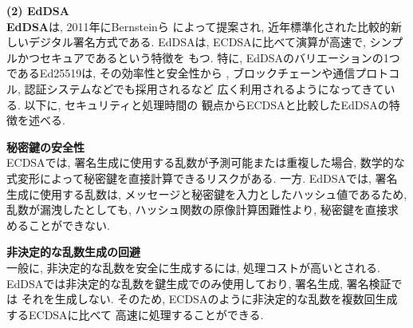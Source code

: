 \documentclass[a4j,9pt,twocolumn]{jsarticle}
\begin{document}
\noindent\textbf{(2) EdDSA}\\
\indent \textbf{EdDSA}は,  2011年にBernsteinら\cite{eddsa}
によって提案され, 近年標準化された比較的新しいデジタル署名方式である. 
EdDSAは, ECDSAに比べて演算が高速で, シンプルかつセキュアであるという特徴を
もつ. 特に, EdDSAのバリエーションの1つであるEd25519は, その効率性と安全性から
, ブロックチェーンや通信プロトコル, 認証システムなどでも採用されるなど
広く利用されるようになってきている. 以下に, セキュリティと処理時間の
観点からECDSAと比較したEdDSAの特徴を述べる.
\smallskip
\begin{description}[labelwidth=3mm, labelsep=2mm]
    \item[(i)] \textbf{秘密鍵の安全性}\\
    ECDSAでは, 署名生成に使用する乱数が予測可能または重複した場合, 
    数学的な式変形によって秘密鍵を直接計算できるリスクがある. 一方. EdDSAでは, 
    署名生成に使用する乱数は, メッセージと秘密鍵を入力としたハッシュ値であるため, 
    乱数が漏洩したとしても, ハッシュ関数の原像計算困難性より, 
    秘密鍵を直接求めることができない. 





\end{description}
\smallskip
\begin{description}[labelwidth=3mm, labelsep=2mm]
    \item[(ii)] \textbf{非決定的な乱数生成の回避}\\
    一般に, 非決定的な乱数を安全に生成するには, 処理コストが高いとされる.
    EdDSAでは非決定的な乱数を鍵生成でのみ使用しており, 署名生成, 署名検証では
    それを生成しない. そのため, ECDSAのように非決定的な乱数を複数回生成するECDSAに比べて
    高速に処理することができる.
\end{description}
\end{document}
